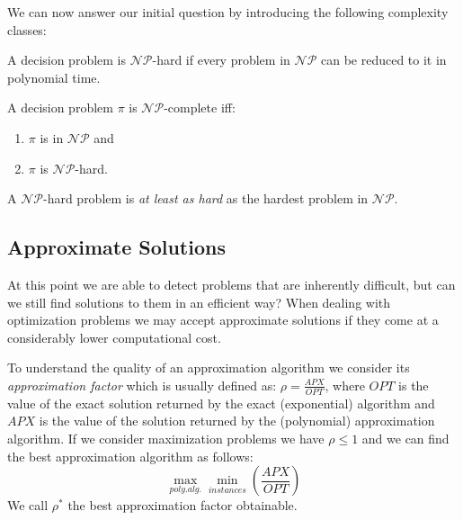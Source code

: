 We can now answer our initial question by introducing the following complexity classes:
\begin{definition}
	A decision problem is $\mathcal{NP}$-hard if every problem in $\mathcal{NP}$ can be reduced to it in polynomial time.
\end{definition}
\begin{definition}
	A decision problem $\pi$ is $\mathcal{NP}$-complete iff:
	\begin{enumerate}
		\item $\pi$ is in $\mathcal{NP}$ and
		\item $\pi$ is $\mathcal{NP}$-hard.
	\end{enumerate}
\end{definition}
A $\mathcal{NP}$-hard problem is \textit{at least as hard} as the hardest problem in $\mathcal{NP}$. 

\subsection{Approximate Solutions}
At this point we are able to detect problems that are inherently difficult, but can we still find solutions to them in an efficient way? When dealing with optimization problems we may accept approximate solutions if they come at a considerably lower computational cost. 

To understand the quality of an approximation algorithm we consider its \textit{approximation factor} which is usually defined as: $\rho = \frac{APX}{OPT}$, where $OPT$ is the value of the exact solution returned by the exact (exponential) algorithm and $APX$ is the value of the solution returned by the (polynomial) approximation algorithm. If we consider maximization problems we have $\rho\leq 1$ and we can find the best approximation algorithm as follows: $$\max_{poly. alg.}\min_{instances} (\frac{APX}{OPT})$$ We call $\rho^{\ast}$ the best approximation factor obtainable.

